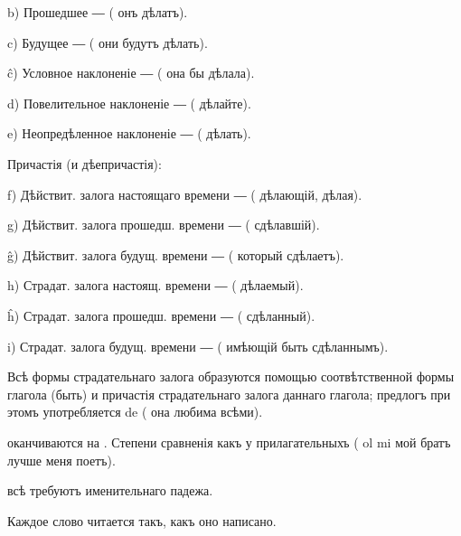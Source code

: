        b) Прошедшее ―  ( онъ дѣлатъ).
        
        c) Будущее ―  ( они будутъ дѣлать).
        
        ĉ) Условное наклоненіе ―  ( она бы дѣлала).
        
        d) Повелительное наклоненіе ―  ( дѣлайте).
        
        e) Неопредѣленное наклоненіе ―  ( дѣлать).
        
\begin{center}
Причастія (и дѣепричастія):
\end{center}
    
        f) Дѣйствит. залога настоящаго времени ―  ( дѣлающій,  дѣлая).
        
        g) Дѣйствит. залога прошедш. времени ―  ( сдѣлавшій).
        
        ĝ) Дѣйствит. залога будущ. времени ―  ( который сдѣлаетъ).
        
        h) Страдат. залога настоящ. времени ―  ( дѣлаемый).
        
        ĥ) Страдат. залога прошедш. времени ―  ( сдѣланный).
        
        i) Страдат. залога будущ. времени ―  ( имѣющій быть сдѣланнымъ).

    Всѣ формы страдательнаго залога образуются помощью соотвѣтственной формы глагола  (быть) и причастія страдательнаго залога даннаго глагола; предлогъ при этомъ употребляется de (  она любима всѣми).
    
     оканчиваются на . Степени сравненія какъ у прилагательныхъ (  ol mi мой братъ лучше меня поетъ).
    
     всѣ требуютъ именительнаго падежа.

\begin{samepage} 
\begin{center}
{\large{}}
\end{center}

     Каждое слово читается такъ, какъ оно написано.
\end{samepage}

